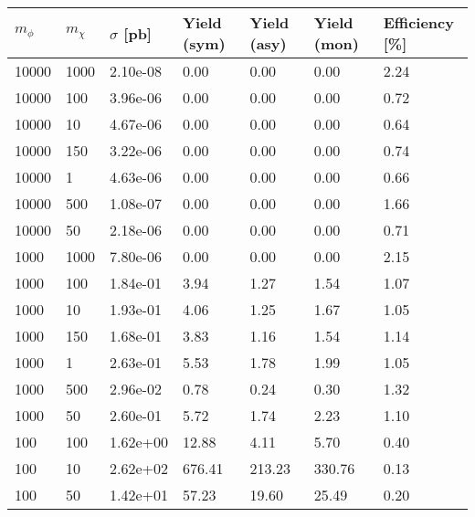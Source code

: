 \begin{table}
\renewcommand{\arraystretch}{1.0}
\footnotesize
\centering
\begin{tabular}{lllllll}
\hline
$m_\phi$ & $m_\chi$ & $\sigma$ [pb] & Yield (sym) & Yield (asy) & Yield (mon) & Efficiency [\%] \\ \hline
10000     &   1000      &   2.10e-08  &   0.00      &   0.00      &   0.00      &   2.24      \\ 
10000     &   100       &   3.96e-06  &   0.00      &   0.00      &   0.00      &   0.72      \\ 
10000     &   10        &   4.67e-06  &   0.00      &   0.00      &   0.00      &   0.64      \\ 
10000     &   150       &   3.22e-06  &   0.00      &   0.00      &   0.00      &   0.74      \\ 
10000     &   1         &   4.63e-06  &   0.00      &   0.00      &   0.00      &   0.66      \\ 
10000     &   500       &   1.08e-07  &   0.00      &   0.00      &   0.00      &   1.66      \\ 
10000     &   50        &   2.18e-06  &   0.00      &   0.00      &   0.00      &   0.71      \\ 
1000      &   1000      &   7.80e-06  &   0.00      &   0.00      &   0.00      &   2.15      \\ 
1000      &   100       &   1.84e-01  &   3.94      &   1.27      &   1.54      &   1.07      \\ 
1000      &   10        &   1.93e-01  &   4.06      &   1.25      &   1.67      &   1.05      \\ 
1000      &   150       &   1.68e-01  &   3.83      &   1.16      &   1.54      &   1.14      \\ 
1000      &   1         &   2.63e-01  &   5.53      &   1.78      &   1.99      &   1.05      \\ 
1000      &   500       &   2.96e-02  &   0.78      &   0.24      &   0.30      &   1.32      \\ 
1000      &   50        &   2.60e-01  &   5.72      &   1.74      &   2.23      &   1.10      \\ 
100       &   100       &   1.62e+00  &   12.88     &   4.11      &   5.70      &   0.40      \\ 
100       &   10        &   2.62e+02  &   676.41    &   213.23    &   330.76    &   0.13      \\ 
100       &   50        &   1.42e+01  &   57.23     &   19.60     &   25.49     &   0.20      \\ 

\end{tabular}
\end{table}
